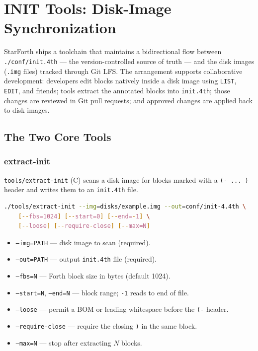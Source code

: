 
\section{INIT Tools: Disk-Image Synchronization}

StarForth ships a toolchain that maintains a bidirectional flow between
\texttt{./conf/init.4th} --- the version-controlled source of truth --- and the
disk images (\texttt{.img} files) tracked through Git LFS. The arrangement
supports collaborative development: developers edit blocks natively inside a
disk image using \texttt{LIST}, \texttt{EDIT}, and friends; tools extract the
annotated blocks into \texttt{init.4th}; those changes are reviewed in Git pull
requests; and approved changes are applied back to disk images.

\subsection{The Two Core Tools}

\subsubsection{extract-init}

\texttt{tools/extract-init} (C) scans a disk image for blocks marked with a
\texttt{(- ... )} header and writes them to an \texttt{init.4th} file.

\begin{lstlisting}[language=bash]
./tools/extract-init --img=disks/example.img --out=conf/init-4.4th \
    [--fbs=1024] [--start=0] [--end=-1] \
    [--loose] [--require-close] [--max=N]
\end{lstlisting}

\begin{itemize}
  \item \texttt{--img=PATH} --- disk image to scan (required).
  \item \texttt{--out=PATH} --- output \texttt{init.4th} file (required).
  \item \texttt{--fbs=N} --- Forth block size in bytes (default 1024).
  \item \texttt{--start=N}, \texttt{--end=N} --- block range; \texttt{-1} reads
    to end of file.
  \item \texttt{--loose} --- permit a BOM or leading whitespace before the
    \texttt{(-} header.
  \item \texttt{--require-close} --- require the closing \texttt{)} in the same
    block.
  \item \texttt{--max=N} --- stop after extracting $N$ blocks.
\end{itemize}

